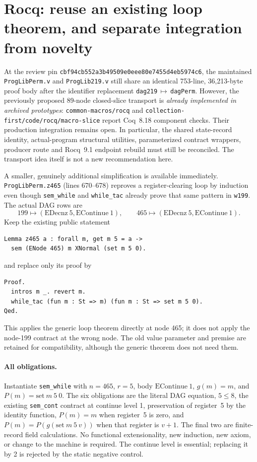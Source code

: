 \section{Rocq: reuse an existing loop theorem, and separate integration from novelty}
At the review pin \texttt{cbf94cb552a3b49509e0eee80e7455d4eb5974c6}, the maintained
\texttt{ProgLibPerm.v} and \texttt{ProgLib219.v} still share an identical 753-line,
36,213-byte proof body after the identifier replacement
\texttt{dag219}\,$\mapsto$\,\texttt{dagPerm}. However, the previously proposed
89-node closed-slice transport is \emph{already implemented in archived prototypes}:
\texttt{common-macros/rocq} and \texttt{collection-first/code/rocq/macro-slice}
report Coq~8.18 component checks. Their production integration remains open.
In particular, the shared state-record identity, actual-program structural utilities,
parameterized contract wrappers, producer route and Rocq~9.1 endpoint rebuild must
still be reconciled. The transport idea itself is not a new recommendation here.

A smaller, genuinely additional simplification is available immediately.
\texttt{ProgLibPerm.z465} (lines 670--678) reproves a register-clearing loop by
induction even though \texttt{sem\_while} and \texttt{while\_tac} already prove that
same pattern in \texttt{w199}. The actual DAG rows are
\[
  199\mapsto(\mathrm{EDecnz}\ 5,\mathrm{EContinue}\ 1),\qquad
  465\mapsto(\mathrm{EDecnz}\ 5,\mathrm{EContinue}\ 1).
\]
Keep the existing public statement
\begin{verbatim}
Lemma z465 a : forall m, get m 5 = a ->
  sem (ENode 465) m XNormal (set m 5 0).
\end{verbatim}
and replace only its proof by
\begin{verbatim}
Proof.
  intros m _. revert m.
  while_tac (fun m : St => m) (fun m : St => set m 5 0).
Qed.
\end{verbatim}
This applies the generic loop theorem directly at node 465; it does not apply
the node-199 contract at the wrong node. The old value parameter and premise are
retained for compatibility, although the generic theorem does not need them.

\paragraph{All obligations.}
Instantiate \texttt{sem\_while} with $n=465$, $r=5$, body
$\mathrm{EContinue}\ 1$, $g(m)=m$, and $P(m)=\mathrm{set}\ m\ 5\ 0$.
The six obligations are the literal DAG equation, $5\leq8$, the existing
\texttt{sem\_cont} contract at continue level 1, preservation of register~5 by
the identity function, $P(m)=m$ when register~5 is zero, and
$P(m)=P(g(\mathrm{set}\ m\ 5\ v))$ when that register is $v+1$.
The final two are finite-record field calculations. No functional extensionality,
new induction, new axiom, or change to the machine is required. The continue level
is essential; replacing it by 2 is rejected by the static negative control.

